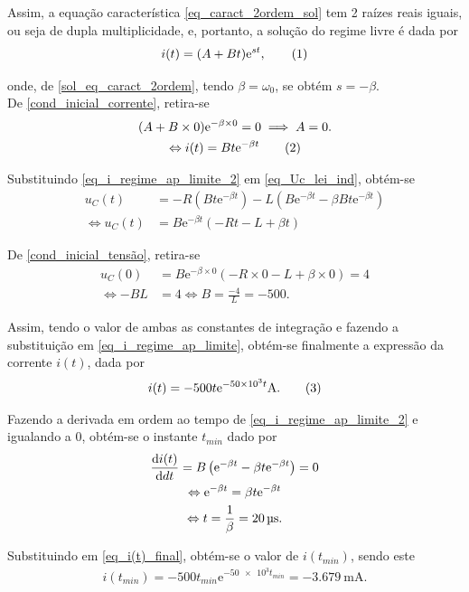 \documentclass[a4paper, titlepage, portuguese]{article}
\newcommand{\eq}{\Leftrightarrow} %
\newcommand\numberthis{\addtocounter{equation}{1}\tag{\theequation}}
\newcommand\e{\mathrm{e} }
\begin{document}
		Assim, a equação característica \eqref{eq_caract_2ordem_sol} tem 2 raízes reais iguais, ou seja de dupla multiplicidade, e, portanto, a solução do regime livre é dada por
		\begin{align*}
			i ( t ) = ( A + B t ) \e ^ { s t }, \numberthis \label{eq_i_regime_ap_limite}
		\end{align*}

		onde, de \eqref{sol_eq_caract_2ordem}, tendo $\beta = \omega_{0}$, se obtém $s = - \beta$. \\

		De \eqref{cond_inicial_corrente}, retira-se
		\begin{gather*}
			( A + B \times 0 ) \e ^ { - \beta \times 0 } = 0 \implies A = 0. \\ \eq
			i(t) = Bt\e^{-\beta t} \numberthis \label{eq_i_regime_ap_limite_2}
		\end{gather*}

		Substituindo \eqref{eq_i_regime_ap_limite_2} em \eqref{eq_Uc_lei_ind}, obtém-se
		\begin{align*}
			 u_C(t) &= -R\left(Bt\e^{-\beta t}\right) - L\left( B\e^{-\beta t} -\beta Bt\e^{-\beta t} \right) \\ \eq
			u_C(t)  &= B\e^{-\beta t} \left(  -Rt - L +\beta t  \right)
		\end{align*}

		De \eqref{cond_inicial_tensão}, retira-se
		\begin{align*}
			 u_C(0)  &= B\e^{-\beta \times 0} \left(  -R\times 0 - L +\beta \times 0  \right) = 4 \\ \eq
			 -BL &= 4 \eq B = \frac{-4}{L} = -500.
		\end{align*}

		Assim, tendo o valor de ambas as constantes de integração e fazendo a substituição em \eqref{eq_i_regime_ap_limite}, obtém-se finalmente a expressão da corrente $i(t)$, dada por
		\begin{align*}
			i(t) = -500t\e^{-\num{50e3}t} \si{\ampere}. \numberthis \label{eq_i(t)_final}
		\end{align*}

		Fazendo a derivada em ordem ao tempo de \eqref{eq_i_regime_ap_limite_2} e igualando a 0, obtém-se o instante $t_{min}$ dado por
		\begin{gather*}
			\dv{i(t)}{dt} = B\left( \e^{-\beta t} - \beta t \e^{-\beta t}\right) = 0 \\ \eq
			\e^{-\beta t} = \beta t\e^{-\beta t} \\ \eq
			t = \frac{1}{\beta} = \SI{20}{\micro\second}.
		\end{gather*}

		Substituindo em \eqref{eq_i(t)_final}, obtém-se o valor de $i(t_{min})$, sendo este
		\begin{gather*}
			i(t_{min}) = -500t_{min}\e^{-\num{50e3}t_{min}} = \SI{-3.679}{\milli\ampere}.
		\end{gather*}


\end{document}

